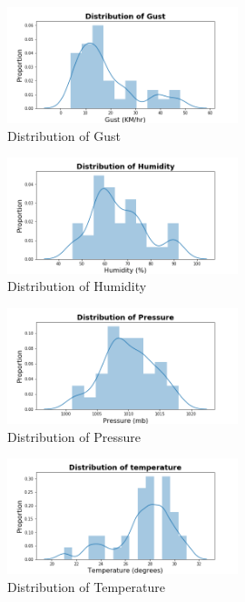 \documentclass[12pt, letterpaper] {article}
\begin{document}
\begin{figure}[H]
    \centering
    \includegraphics[width=0.6\textwidth, height=0.3\textheight]{Images/distplot_gust.png}
    \caption{Distribution of Gust}
    \label{fig:Distribution of Gust}
\end{figure}

\begin{figure}[H]
    \centering
    \includegraphics[width=0.6\textwidth, height=0.3\textheight]{Images/distplot_humidity.png}
    \caption{Distribution of Humidity}
    \label{fig:Distribution of Humidity}
\end{figure}

\begin{figure}[H]
    \centering
    \includegraphics[width=0.6\textwidth, height=0.3\textheight]{Images/distplot_pressure.png}
    \caption{Distribution of Pressure}
    \label{fig:Distribution of Pressure}
\end{figure}

\begin{figure}[H]
    \centering
    \includegraphics[width=0.6\textwidth, height=0.3\textheight]{Images/distplot_temp.png}
    \caption{Distribution of Temperature}
    \label{fig:Distribution of Temperature}
\end{figure}
\end{document}
